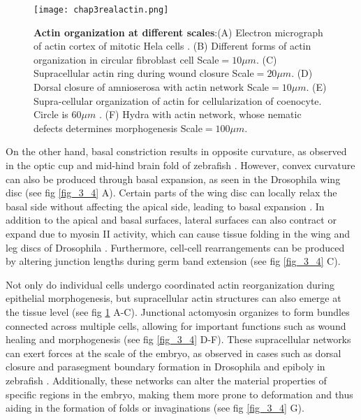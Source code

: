 \begin{figure}
	\centering
	\texttt{[image: chap3realactin.png]}
	\caption{\label{fig_3_3} \textbf{Actin organization at different scales}:(A) Electron micrograph of actin cortex of mitotic Hela cells \cite{kelkar2020}. (B) Different forms of actin organization in circular fibroblast cell \cite{jalal2019} Scale$= 10\mu m$. (C) Supracellular actin ring during wound closure \cite{brugues2014} Scale$=20 \mu m$. (D) Dorsal closure of amnioserosa with actin network \cite{ducuing2016} Scale$= 10 \mu m$. (E) Supra-cellular organization of actin for cellularization of coenocyte. Circle is $60 \mu m$ \cite{dudin2019}. (F) Hydra with actin network, whose nematic defects determines morphogenesis \cite{maroudas-sacks2021} Scale$= 100 \mu m$.
	}
\end{figure}

On the other hand, basal constriction results in opposite curvature, as observed in the optic cup and mid-hind brain fold of zebrafish \cite{sidhaye2017, gutzman2018}. However, convex curvature can also be produced through basal expansion, as seen in the Drosophila wing disc (see fig \ref{fig_3_4} A). Certain parts of the wing disc can locally relax the basal side without affecting the apical side, leading to basal expansion \cite{sui2018}. In addition to the apical and basal surfaces, lateral surfaces can also contract or expand due to myosin II activity, which can cause tissue folding in the wing and leg discs of Drosophila \cite{sui2018, monier2015}. Furthermore, cell-cell rearrangements can be produced by altering junction lengths during germ band extension \cite{yu2016, collinet2015} (see fig \ref{fig_3_4} C). 

Not only do individual cells undergo coordinated actin reorganization during epithelial morphogenesis, but supracellular actin structures can also emerge at the tissue level (see fig \ref{fig_3_3} A-C). Junctional actomyosin organizes to form bundles connected across multiple cells, allowing for important functions such as wound healing and morphogenesis \cite{brugues2014, clarke2021} (see fig \ref{fig_3_4} D-F). These supracellular networks can exert forces at the scale of the embryo, as observed in cases such as dorsal closure and parasegment boundary formation in Drosophila and epiboly in zebrafish \cite{ducuing2016, calzolari2014}. Additionally, these networks can alter the material properties of specific regions in the embryo, making them more prone to deformation and thus aiding in the formation of folds or invaginations (see fig \ref{fig_3_4} G). 

